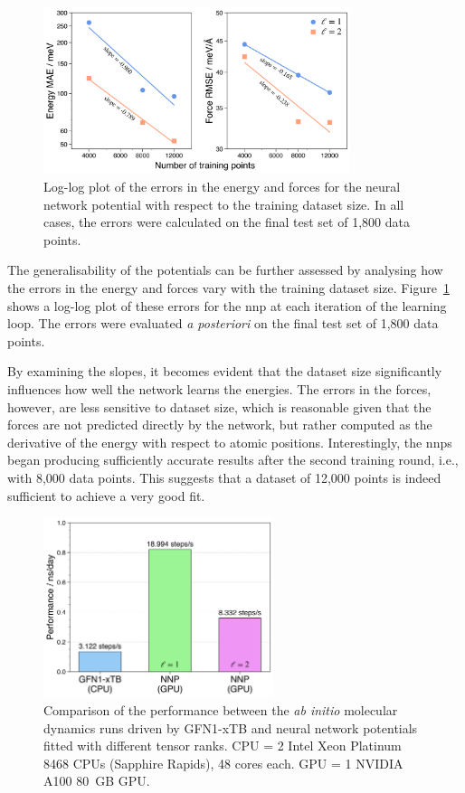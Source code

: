 \begin{figure}[t]
    \centering
    \includegraphics[width=0.8\textwidth]{Figures/4_Results/results_nnp_loglog_energy_force.png}
    \caption{Log-log plot of the errors in the energy and forces for the neural network potential with respect to the training dataset size. In all cases, the errors were calculated on the final test set of 1,800 data points.}
    \label{fig:nnp_log-log}
\end{figure}

The generalisability of the potentials can be further assessed by analysing how the errors in the energy and forces vary with the training dataset size. Figure~\ref{fig:nnp_log-log} shows a log-log plot of these errors for the \ac{nnp} at each iteration of the learning loop. The errors were evaluated \textit{a posteriori} on the final test set of 1,800 data points.

By examining the slopes, it becomes evident that the dataset size significantly influences how well the network learns the energies. The errors in the forces, however, are less sensitive to dataset size, which is reasonable given that the forces are not predicted directly by the network, but rather computed as the derivative of the energy with respect to atomic positions. Interestingly, the \acp{nnp} began producing sufficiently accurate results after the second training round, i.e., with 8,000 data points. This suggests that a dataset of 12,000 points is indeed sufficient to achieve a very good fit.

\begin{figure}[t]
    \centering
    \includegraphics[width=0.6\textwidth]{Figures/4_Results/results_performance_comparison.png}
    \caption{Comparison of the performance between the \textit{ab initio} molecular dynamics runs driven by GFN1-xTB and neural network potentials fitted with different tensor ranks. CPU = 2 Intel Xeon Platinum 8468 CPUs (Sapphire Rapids), 48 cores each. GPU = 1 NVIDIA A100 80~GB GPU.}
    \label{fig:performance_comparison}
\end{figure}

